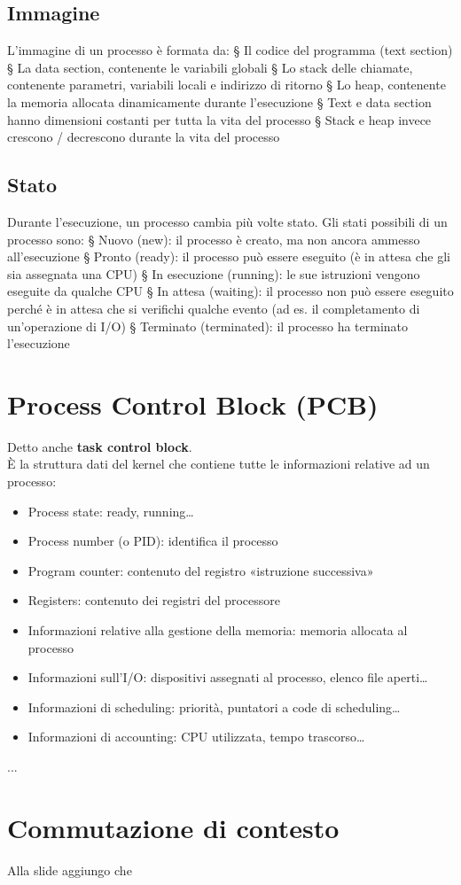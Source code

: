 \subsection{Immagine}
L'immagine di un processo è formata da:
§ Il codice del programma (text section)
§ La data section, contenente le variabili globali
§ Lo stack delle chiamate, contenente parametri, variabili locali e indirizzo
di ritorno
§ Lo heap, contenente la memoria allocata dinamicamente durante
l'esecuzione
§ Text e data section hanno dimensioni costanti per tutta la vita del processo
§ Stack e heap invece crescono / decrescono durante la vita del processo

\subsection{Stato}
Durante l'esecuzione, un processo cambia più volte stato. Gli stati possibili di un processo sono:
§ Nuovo (new): il processo è creato, ma non ancora ammesso all'esecuzione
§ Pronto (ready): il processo può essere eseguito (è in attesa che gli sia assegnata una CPU)
§ In esecuzione (running): le sue istruzioni vengono eseguite da qualche CPU
§ In attesa (waiting): il processo non può essere eseguito perché è in attesa che si verifichi qualche evento (ad es. il completamento di un'operazione di I/O)
§ Terminato (terminated): il processo ha terminato l'esecuzione

\section{Process Control Block (PCB)}
Detto anche \textbf{task control block}.
\\È la struttura dati del kernel che contiene tutte le informazioni relative ad un processo:
\begin{itemize}
    \item Process state: ready, running…
    \item Process number (o PID): identifica il processo
    \item Program counter: contenuto del registro «istruzione successiva»
    \item Registers: contenuto dei registri del processore
    \item Informazioni relative alla gestione della memoria: memoria allocata al processo
    \item Informazioni sull'I/O: dispositivi assegnati al processo, elenco file aperti…
    \item Informazioni di scheduling: priorità, puntatori a code di scheduling…
    \item Informazioni di accounting: CPU utilizzata, tempo trascorso…
\end{itemize}


...



\section{Commutazione di contesto}
Alla slide aggiungo che 